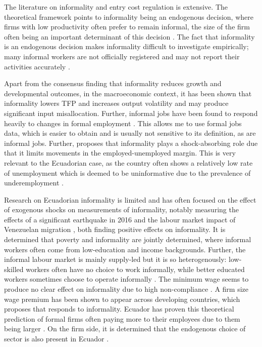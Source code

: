 \documentclass[11pt,a4paper]{article}\usepackage[]{graphicx}\usepackage[]{xcolor}
\begin{document}
The literature on informality and entry cost regulation is extensive. The theoretical framework points to informality being an endogenous decision, where firms with low productivity often prefer to remain informal, the size of the firm often being an important determinant of this decision \parencite{Delechat2020, MauricioPrado.2011, ElianeElBadaoui.2010}. The fact that informality is an endogenous decision makes informality difficult to investigate empirically; many informal workers are not officially registered and may not report their activities accurately \textcite{Oviedo.2009}. 

Apart from the consensus finding that informality reduces growth and developmental outcomes, in the macroeconomic context, it has been shown that informality lowers TFP and increases output volatility and may produce significant input misallocation. Further, informal jobs have been found to respond heavily to changes in formal employment \parencite{Leyva.2020}. This allows me to use formal jobs data, which is easier to obtain and is usually not sensitive to its definition, as are informal jobs. Further, \textcite{Lambert.2020} proposes that informality plays a shock-absorbing role due that it limits movements in the employed-unemployed margin. This is very relevant to the Ecuadorian case, as the country often shows a relatively low rate of unemployment which is deemed to be uninformative due to the prevalence of underemployment \parencite{LaTorre.2017}.

Research on Ecuadorian informality is limited and has often focused on the effect of exogenous shocks on measurements of informality, notably measuring the effects of a significant earthquake in 2016 \parencite{Mendoza.2020} and the labour market impact of Venezuelan migration \parencite{Olivieri.2022}, both finding positive effects on informality. It is determined that poverty and informality are jointly determined, where informal workers often come from low-education and income backgrounds. Further, the informal labour market is mainly supply-led but it is so heterogenously: low-skilled workers often have no choice to work informally, while better educated workers sometimes choose to operate informally \parencite{Canelas.2019}. The minimum wage seems to produce no clear effect on informality due to high non-compliance \parencite{Canelas.2014}. A firm size wage premium has been shown to appear across developing countries, which \textcite{ElianeElBadaoui.2010} proposes that responds to informality. Ecuador has proven this theoretical prediction of formal firms often paying more to their employees due to them being larger \textcite{MacIsaac.1997}. On the firm side, it is determined that the endogenous choice of sector is also present in Ecuador \textcite{Medvedev.2016}. 
\end{document}
